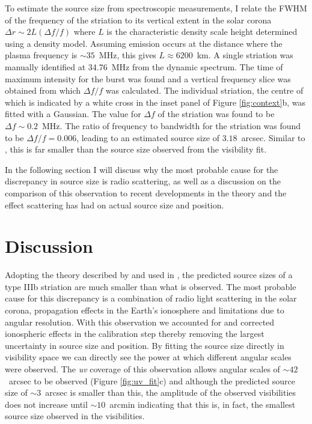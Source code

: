 To estimate the source size from spectroscopic measurements, I relate the FWHM of the frequency of the striation to its vertical extent in the solar corona $\Delta r {\sim} 2L \left(\Delta f/f\right)$ where $L$ is the characteristic density scale height \citep{Kontar2017} determined using a \cite{Newkirk1961} density model. Assuming emission occurs at the distance where the plasma frequency is $\sim 35$~MHz, this gives $L \approx 6200$~km.
A single striation was manually identified at 34.76~MHz from the dynamic spectrum. The time of maximum intensity for the burst was found and a vertical frequency slice was obtained from which $\Delta f/f$ was calculated. The individual striation, the centre of which is indicated by a white cross in the inset panel of Figure \ref{fig:context}b, was fitted with a Gaussian. The value for $\Delta f$ of the striation was found to be $\Delta f \sim 0.2$~MHz. The ratio of frequency to bandwidth for the striation was found to be $\Delta f/f = 0.006$, leading to an estimated source size of $3.18$~arcsec. 
Similar to \cite{Kontar2017}, this is far smaller than the source size observed from the visibility fit.

In the following section I will discuss why the most probable cause for the discrepancy in source size is radio scattering, as well as a discussion on the comparison of this observation to recent developments in the theory and the effect scattering has had on actual source size and position.

\section{Discussion}\label{sec:conclusion}

Adopting the theory described by \cite{Takakura1975} and used in \cite{Kontar2017}, the predicted source sizes of a type IIIb striation are much smaller than what is observed. The most probable cause for this discrepancy is a combination of radio light scattering in the solar corona, propagation effects in the Earth's ionosphere and limitations due to angular resolution.
With this observation we accounted for and corrected ionospheric effects in the calibration step \citep[Section \ref{sec:data} and ][]{DeGasperin2019} thereby removing the largest uncertainty in source size and position. By fitting the source size directly in visibility space we can directly see the power at which different angular scales were observed. The \textit{uv} coverage of this observation allows angular scales of ${\sim} 42$~arcsec to be observed (Figure \ref{fig:uv_fit}c) and although the predicted source size of ${\sim}3$~arcsec is smaller than this, the amplitude of the observed visibilities does not increase until ${\sim} 10$~arcmin indicating that this is, in fact, the smallest source size observed in the visibilities.

